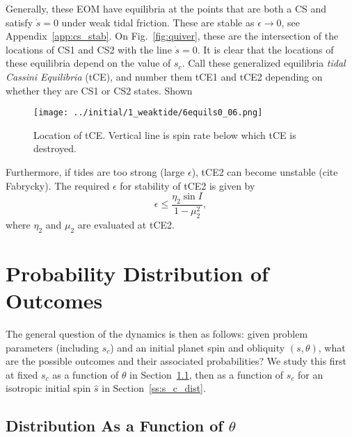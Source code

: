 \documentclass[
        fleqn,
        usenatbib,
        referee,
    ]{mnras}
\begin{document}
Generally, these EOM have equilibria at the points that are both a CS and
satisfy $\dot{s} = 0$ under weak tidal friction. These are stable as $\epsilon
\to 0$, see Appendix~\ref{app:cs_stab}. On Fig.~\ref{fig:quiver}, these are the
intersection of the locations of CS1 and CS2 with the line $\dot{s} = 0$. It is
clear that the locations of these equilibria depend on the value of $s_c$. Call
these generalized equilibria \emph{tidal Cassini Equilibria} (tCE), and number
them tCE1 and tCE2 depending on whether they are CS1 or CS2 states. Shown
\begin{figure}
    \centering
    \texttt{[image: ../initial/1\_weaktide/6equils0\_06.png]}
    \caption{Location of tCE\@. Vertical line is spin rate below which tCE is
    destroyed.}\label{fig:6equils}
\end{figure}

Furthermore, if tides are too strong (large $\epsilon$), tCE2 can become
unstable (cite Fabrycky). The required $\epsilon$ for stability of tCE2 is given
by
\begin{equation}
    \epsilon \leq \frac{\eta_2 \sin I}{1 - \mu_2^2},
\end{equation}
where $\eta_2$ and $\mu_2$ are evaluated at tCE2.

\section{Probability Distribution of Outcomes}\label{s:sim}

The general question of the dynamics is then as follows: given problem
parameters (including $s_c$) and an initial planet spin and obliquity $(s,
\theta)$, what are the possible outcomes and their associated probabilities? We
study this first at fixed $s_c$ as a function of $\theta$ in
Section~\ref{ss:q_dist}, then as a function of $s_c$ for an isotropic initial
spin $\hat{s}$ in Section~\ref{ss:s_c_dist}.

\subsection{Distribution As a Function of $\theta$}\label{ss:q_dist}
\end{document}
